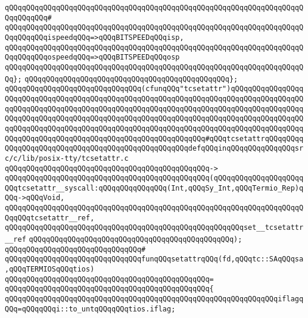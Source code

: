 \verb|qQQqqQQqqQQqqQQqqQQqqQQqqQQqqQQqqQQqqQQqqQQqqQQqqQQqqQQqqQQqqQQqqQQqqQQqqQQqqQQq#|\newline
\verb|qQQqqQQqqQQqqQQqqQQqqQQqqQQqqQQqqQQqqQQqqQQqqQQqqQQqqQQqqQQqqQQqqQQqqQQqqQQqqQQqispeedqQQq=>qQQqBITSPEEDqQQqisp,|\newline
\verb|qQQqqQQqqQQqqQQqqQQqqQQqqQQqqQQqqQQqqQQqqQQqqQQqqQQqqQQqqQQqqQQqqQQqqQQqqQQqqQQqospeedqQQq=>qQQqBITSPEEDqQQqosp|\newline
\verb|qQQqqQQqqQQqqQQqqQQqqQQqqQQqqQQqqQQqqQQqqQQqqQQqqQQqqQQqqQQqqQQqqQQqqQQq};|\newline
\verb|qQQqqQQqqQQqqQQqqQQqqQQqqQQqqQQqqQQqqQQqqQQqqQQq};|\newline
\newline
\newline
\verb|qQQqqQQqqQQqqQQqqQQqqQQqqQQqqQQq(cfunqQQq"tcsetattr")qQQqqQQqqQQqqQQqqQQqqQQqqQQqqQQqqQQqqQQqqQQqqQQqqQQqqQQqqQQqqQQqqQQqqQQqqQQqqQQqqQQqqQQqqQQqqQQqqQQqqQQqqQQqqQQqqQQqqQQqqQQqqQQqqQQqqQQqqQQqqQQqqQQqqQQqqQQqqQQqqQQqqQQqqQQqqQQqqQQqqQQqqQQqqQQqqQQqqQQqqQQqqQQqqQQqqQQqqQQqqQQqqQQqqQQqqQQqqQQqqQQqqQQqqQQqqQQqqQQqqQQqqQQqqQQqqQQqqQQqqQQqqQQqqQQqqQQqqQQqqQQqqQQqqQQqqQQqqQQqqQQqqQQqqQQqqQQqqQQqqQQq#qQQqtcsetattrqQQqqQQqqQQqqQQqqQQqqQQqqQQqqQQqqQQqqQQqqQQqqQQqqQQqdefqQQqinqQQqqQQqqQQqqQQqsrc/c/lib/posix-tty/tcsetattr.c|\newline
\verb|qQQqqQQqqQQqqQQqqQQqqQQqqQQqqQQqqQQqqQQqqQQqqQQq->|\newline
\verb|qQQqqQQqqQQqqQQqqQQqqQQqqQQqqQQqqQQqqQQqqQQqqQQq(qQQqqQQqqQQqqQQqqQQqqQQqtcsetattr__syscall:qQQqqQQqqQQqqQQq(Int,qQQqSy_Int,qQQqTermio_Rep)qQQq->qQQqVoid,|\newline
\verb|qQQqqQQqqQQqqQQqqQQqqQQqqQQqqQQqqQQqqQQqqQQqqQQqqQQqqQQqqQQqqQQqqQQqqQQqqQQqtcsetattr__ref,|\newline
\verb|qQQqqQQqqQQqqQQqqQQqqQQqqQQqqQQqqQQqqQQqqQQqqQQqqQQqqQQqset__tcsetattr__ref|\newline
\verb|qQQqqQQqqQQqqQQqqQQqqQQqqQQqqQQqqQQqqQQqqQQqqQQq);|\newline
\verb|qQQqqQQqqQQqqQQqqQQqqQQqqQQqqQQq#|\newline
\verb|qQQqqQQqqQQqqQQqqQQqqQQqqQQqqQQqfunqQQqsetattrqQQq(fd,qQQqtc::SAqQQqsa,qQQqTERMIOSqQQqtios)|\newline
\verb|qQQqqQQqqQQqqQQqqQQqqQQqqQQqqQQqqQQqqQQqqQQqqQQq=|\newline
\verb|qQQqqQQqqQQqqQQqqQQqqQQqqQQqqQQqqQQqqQQqqQQqqQQq{|\newline
\verb|qQQqqQQqqQQqqQQqqQQqqQQqqQQqqQQqqQQqqQQqqQQqqQQqqQQqqQQqqQQqqQQqiflagqQQq=qQQqqQQqi::to_untqQQqqQQqtios.iflag;|\newline
